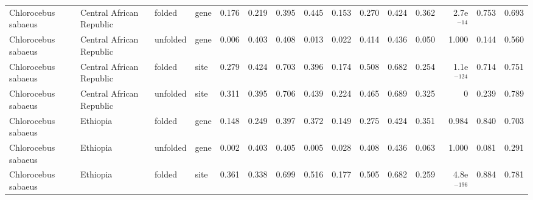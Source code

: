 \begin{longtable}{llllrrrrrrrrrrr}
 Chlorocebus sabaeus &  Central African Republic &    folded &  gene &                              0.176 &                               0.219 &                 0.395 &                 0.445 &                              0.153 &                               0.270 &                 0.424 &                 0.362 &  2.7e$^{-14}$ &  0.753 &  0.693 \\
 Chlorocebus sabaeus &  Central African Republic &  unfolded &  gene &                              0.006 &                               0.403 &                 0.408 &                 0.013 &                              0.022 &                               0.414 &                 0.436 &                 0.050 &         1.000 &  0.144 &  0.560 \\
 Chlorocebus sabaeus &  Central African Republic &    folded &  site &                              0.279 &                               0.424 &                 0.703 &                 0.396 &                              0.174 &                               0.508 &                 0.682 &                 0.254 & 1.1e$^{-124}$ &  0.714 &  0.751 \\
 Chlorocebus sabaeus &  Central African Republic &  unfolded &  site &                              0.311 &                               0.395 &                 0.706 &                 0.439 &                              0.224 &                               0.465 &                 0.689 &                 0.325 &             0 &  0.239 &  0.789 \\
 Chlorocebus sabaeus &                  Ethiopia &    folded &  gene &                              0.148 &                               0.249 &                 0.397 &                 0.372 &                              0.149 &                               0.275 &                 0.424 &                 0.351 &         0.984 &  0.840 &  0.703 \\
 Chlorocebus sabaeus &                  Ethiopia &  unfolded &  gene &                              0.002 &                               0.403 &                 0.405 &                 0.005 &                              0.028 &                               0.408 &                 0.436 &                 0.063 &         1.000 &  0.081 &  0.291 \\
 Chlorocebus sabaeus &                  Ethiopia &    folded &  site &                              0.361 &                               0.338 &                 0.699 &                 0.516 &                              0.177 &                               0.505 &                 0.682 &                 0.259 & 4.8e$^{-196}$ &  0.884 &  0.781 \\

\end{longtable}
